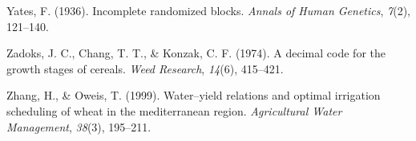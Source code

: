 \documentclass[12pt,oneside]{dukestatscithesis} %
\newlength{\cslhangindent}
\newenvironment{cslreferences}%
  {\setlength{\parindent}{0pt}%
  \everypar{\setlength{\hangindent}{\cslhangindent}}\ignorespaces}%
  {\par}
\begin{document}
\begin{cslreferences}
\leavevmode\hypertarget{ref-yates1936incomplete}{}%
Yates, F. (1936). Incomplete randomized blocks. \emph{Annals of Human Genetics}, \emph{7}(2), 121--140.

\leavevmode\hypertarget{ref-zadoks1974decimal}{}%
Zadoks, J. C., Chang, T. T., \& Konzak, C. F. (1974). A decimal code for the growth stages of cereals. \emph{Weed Research}, \emph{14}(6), 415--421.

\leavevmode\hypertarget{ref-zhang1999water}{}%
Zhang, H., \& Oweis, T. (1999). Water--yield relations and optimal irrigation scheduling of wheat in the mediterranean region. \emph{Agricultural Water Management}, \emph{38}(3), 195--211.
\end{cslreferences}
\end{document}
